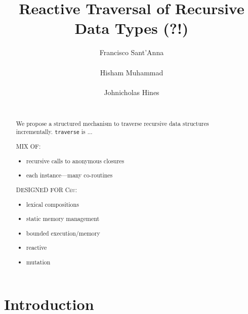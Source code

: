 \documentclass{acm_proc_article-sp}
\newcommand{\CEU}{\textsc{C\'{e}u}\xspace}
\newcommand{\code}[1] {{\small{\texttt{#1}}}}
\begin{document}
\title{Reactive Traversal of Recursive Data Types (?!)}

\author{
\alignauthor
Francisco Sant'Anna \\
     \\
\alignauthor
Hisham Muhammad \\
     \\
\alignauthor
Johnicholas Hines \\
     \\
}

\maketitle
\begin{abstract}
We propose a structured mechanism to traverse recursive data structures 
incrementally.
\code{traverse} is ...


MIX OF:
\begin{itemize}
    \item recursive calls to anonymous closures
    \item each instance---many co-routines
\end{itemize}

DESIGNED FOR \CEU:
\begin{itemize}
    \item lexical compositions
    \item static memory management
    \item bounded execution/memory
    \item reactive
    \item mutation
\end{itemize}


\end{abstract}




\section{Introduction}
\end{document}
